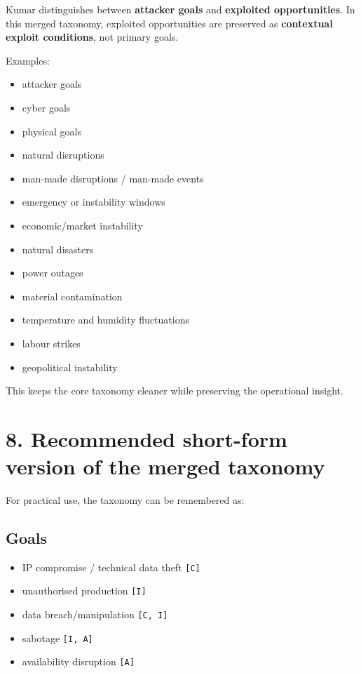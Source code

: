 \documentclass[10pt,a4paper,oneside]{report}
\begin{document}
Kumar distinguishes between \textbf{attacker goals} and \textbf{exploited opportunities}. In this merged taxonomy, exploited opportunities are preserved as \textbf{contextual exploit conditions}, not primary goals.

Examples:

\begin{itemize}
\item attacker goals
\item cyber goals
\item physical goals
\item natural disruptions
\item man-made disruptions / man-made events
\item emergency or instability windows
\item economic/market instability
\item natural disasters
\item power outages
\item material contamination
\item temperature and humidity fluctuations
\item labour strikes
\item geopolitical instability
\end{itemize}

This keeps the core taxonomy cleaner while preserving the operational insight.


\chapter{8. Recommended short-form version of the merged taxonomy}


For practical use, the taxonomy can be remembered as:


\section{Goals}


\begin{itemize}
\item IP compromise / technical data theft \texttt{[C]}
\item unauthorised production \texttt{[I]}
\item data breach/manipulation \texttt{[C, I]}
\item sabotage \texttt{[I, A]}
\item availability disruption \texttt{[A]}
\end{itemize}
\end{document}
